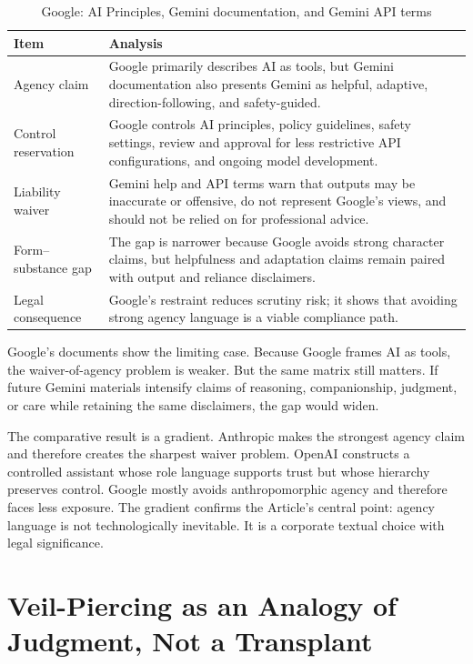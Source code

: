\documentclass[11pt,a4paper]{article}
\begin{document}
\begin{table}[htbp]
\centering
\small
\caption{Google: AI Principles, Gemini documentation, and Gemini API terms}
\label{tab:google}
\begin{tabularx}{\textwidth}{@{}P{3.2cm}Y@{}}
\toprule
\textbf{Item} & \textbf{Analysis} \\
\midrule
Agency claim & Google primarily describes AI as tools, but Gemini documentation also presents Gemini as helpful, adaptive, direction-following, and safety-guided. \\
Control reservation & Google controls AI principles, policy guidelines, safety settings, review and approval for less restrictive API configurations, and ongoing model development. \\
Liability waiver & Gemini help and API terms warn that outputs may be inaccurate or offensive, do not represent Google's views, and should not be relied on for professional advice. \\
Form--substance gap & The gap is narrower because Google avoids strong character claims, but helpfulness and adaptation claims remain paired with output and reliance disclaimers. \\
Legal consequence & Google's restraint reduces scrutiny risk; it shows that avoiding strong agency language is a viable compliance path. \\
\bottomrule
\end{tabularx}
\end{table}

Google's documents show the limiting case. Because Google frames AI as tools, the waiver-of-agency problem is weaker. But the same matrix still matters. If future Gemini materials intensify claims of reasoning, companionship, judgment, or care while retaining the same disclaimers, the gap would widen.

The comparative result is a gradient. Anthropic makes the strongest agency claim and therefore creates the sharpest waiver problem. OpenAI constructs a controlled assistant whose role language supports trust but whose hierarchy preserves control. Google mostly avoids anthropomorphic agency and therefore faces less exposure. The gradient confirms the Article's central point: agency language is not technologically inevitable. It is a corporate textual choice with legal significance.

\section{Veil-Piercing as an Analogy of Judgment, Not a Transplant}
\end{document}
